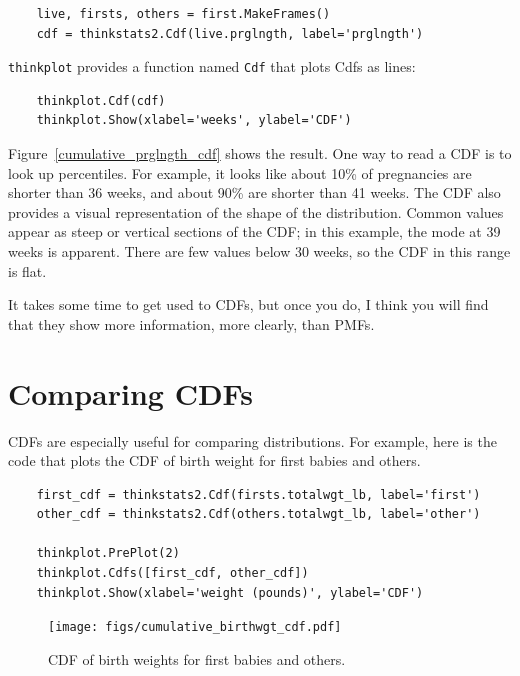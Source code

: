 \documentclass[12pt]{book}
\theoremstyle{exercise}
\begin{document}
\begin{verbatim}
    live, firsts, others = first.MakeFrames()
    cdf = thinkstats2.Cdf(live.prglngth, label='prglngth')
\end{verbatim}

{\tt thinkplot} provides a function named {\tt Cdf} that
plots Cdfs as lines:%

\begin{verbatim}
    thinkplot.Cdf(cdf)
    thinkplot.Show(xlabel='weeks', ylabel='CDF')
\end{verbatim}

Figure~\ref{cumulative_prglngth_cdf} shows the result.  One way to
read a CDF is to look up percentiles.  For example, it looks like
about 10\% of pregnancies are shorter than 36 weeks, and about 90\%
are shorter than 41 weeks.  The CDF also provides a visual
representation of the shape of the distribution.  Common values appear
as steep or vertical sections of the CDF; in this example, the mode at
39 weeks is apparent.  There are few values below 30 weeks, so
the CDF in this range is flat.%

It takes some time to get used to CDFs, but once you
do, I think you will find that they show more information, more
clearly, than PMFs.


\section{Comparing CDFs}%
\label{birth_weights}%
%
%
%

CDFs are especially useful for comparing distributions.  For
example, here is the code that plots the CDF of birth
weight for first babies and others.%
%

\begin{verbatim}
    first_cdf = thinkstats2.Cdf(firsts.totalwgt_lb, label='first')
    other_cdf = thinkstats2.Cdf(others.totalwgt_lb, label='other')

    thinkplot.PrePlot(2)
    thinkplot.Cdfs([first_cdf, other_cdf])
    thinkplot.Show(xlabel='weight (pounds)', ylabel='CDF')
\end{verbatim}

\begin{figure}
\centerline{\texttt{[image: figs/cumulative\_birthwgt\_cdf.pdf]}}
\caption{CDF of birth weights for first babies and others.}%
\label{cumulative_birthwgt_cdf}
\end{figure}
\end{document}
